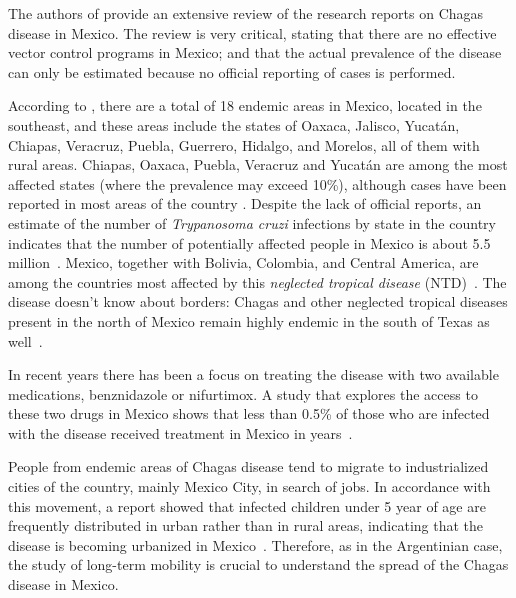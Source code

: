 The authors of \cite{carabarin2013chagas} provide an extensive review of the 
research reports on Chagas disease in Mexico.
The review is very critical, stating that there are no effective vector control programs in Mexico;
and that the actual prevalence of the disease 
can only be estimated because no official reporting of cases is performed.

According to \cite{dumonteil1999update}, 
there are a total of 18 endemic areas in Mexico, located in the southeast, and
these areas include the states of Oaxaca, Jalisco, Yucatán, Chiapas, Veracruz,
Puebla, Guerrero, Hidalgo, and Morelos, all of them with rural areas.
Chiapas, Oaxaca, Puebla, Veracruz and Yucatán are among the most affected states (where the prevalence may exceed 10\%), although cases have been reported in most areas of the country
\cite{cruz2006chagmex,dumonteil1999update}.
Despite the lack of official reports, an estimate of the number of \textit{Trypanosoma cruzi} infections by state in the country
indicates that the number of potentially
affected people in Mexico is about 5.5 million~\cite{carabarin2013chagas}.
Mexico, together with Bolivia, Colombia, and Central
America, are among the countries most affected by this 
\textit{neglected tropical disease} (NTD)~\cite{hotez2013innovation}.
The disease doesn't know about borders:
Chagas and other neglected tropical diseases present in the north of Mexico remain highly endemic in the south of Texas as well~\cite{hotez2012texas}.

In recent years there has been a focus on treating the disease with two available
medications, benznidazole or nifurtimox. A study
that explores the access to these two drugs in Mexico 
shows that less than 0.5\% of those who are infected with
the disease received treatment in Mexico in years~\cite{manne2013barriers}.


People from endemic areas of Chagas disease tend to migrate to industrialized cities of the country, mainly Mexico City, in search of jobs. 
In accordance with this movement, a report showed
that infected children under 5 year of age are frequently distributed in urban
rather than in rural areas, indicating that the disease is becoming urbanized in
Mexico~\cite{guzman2001epidemiology}.
Therefore, as in the Argentinian case, the study of long-term mobility is crucial to understand the spread of the Chagas disease in Mexico.






